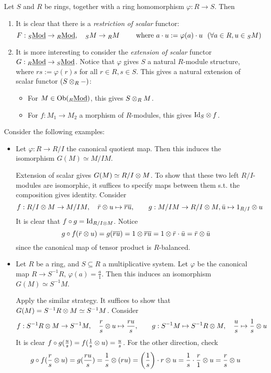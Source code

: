 \documentclass{article}
\begin{document}
Let $S$ and $R$ be rings, together with a ring homomorphism $\varphi: R \to S$. Then 
\begin{enumerate}
    \item It is clear that there is a \emph{restriction of scalar} functor:
    \[
        F: \catlmod{S} \to \catlmod{R}, \quad _SM \to {_RM} \qquad \text{ where } a\cdot u := \varphi(a)\cdot u\ \ (\forall a\in R, u\in {_SM})
    \]
    \item It is more interesting to consider the \emph{extension of scalar} functor $G: {}_{R}\underline{\textup{Mod}} \to {}_{S}\underline{\textup{Mod}}$. Notice that $\varphi$ gives $S$ a natural $R$-module structure, where $rs := \varphi(r)s$ for all $r \in R, s\in S$. This gives a natural extension of scalar functor $(S \otimes_R -)$:
    \begin{itemize}
        \item For $M \in \mathrm{Ob}({}_{R}\underline{\textup{Mod}})$, this gives $S \otimes_R M$.
        \item For $f: M_1 \to M_2$ a morphism of $R$-modules, this gives $\mathrm{Id}_S \otimes f$.
    \end{itemize}
\end{enumerate}

\begin{example}
    Consider the following examples:
    \begin{itemize}
        \item Let $\varphi: R \to R/I$ the canonical quotient map. Then this induces the isomorphism $G(M) \simeq M/IM$.
        
        Extension of scalar gives $G(M) \simeq R/I \otimes M$. To show that these two left $R/I$-modules are isomorphic, it suffices to specify maps between them s.t. the composition gives identity. Consider
        \[
            f: R/I \otimes M \to M/IM, \quad \bar{r} \otimes u \mapsto \overline{ru}, \qquad g: M/IM \to R/I \otimes M, \bar{u} \mapsto 1_{R/I} \otimes u
        \]
        It is clear that $f \circ g = \mathrm{Id}_{R/I \otimes M}$. Notice
        \[
            g \circ f (\bar{r} \otimes u) = g(\overline{ru}) = 1 \otimes \overline{ru} = 1 \otimes \bar{r} \cdot \bar{u} = \bar{r} \otimes \bar{u}
        \]
        since the canonical map of tensor product is $R$-balanced.
        \item Let $R$ be a ring, and $S \subseteq R$ a multiplicative system. Let $\varphi$ be the canonical map $R \to S^{-1}R$, $\varphi(a) = \frac{a}{1}$. Then this induces an isomorphism $G(M) \simeq S^{-1}M$.
        
        Apply the similar strategy. It suffices to show that $G(M) = S^{-1}R \otimes M \simeq S^{-1}M$. Consider
        \[
            f: S^{-1}R \otimes M \to S^{-1}M, \quad \frac{r}{s} \otimes u \mapsto \frac{ru}{s}, \qquad g: S^{-1}M \mapsto S^{-1}R \otimes M, \quad \frac{u}{s} \mapsto \frac{1}{s} \otimes u
        \]
        It is clear $f \circ g(\frac{u}{s}) = f(\frac{1}{s} \otimes u) = \frac{u}{s}$. For the other direction, check
        \[
            g \circ f (\frac{r}{s} \otimes u) = g(\frac{ru}{s}) = \frac{1}{s} \otimes (ru) = \left(\frac{1}{s}\right)\cdot r \otimes u = \frac{1}{s} \cdot \frac{r}{1} \otimes u = \frac{r}{s} \otimes u
        \]
    \end{itemize}
\end{example}
\end{document}
